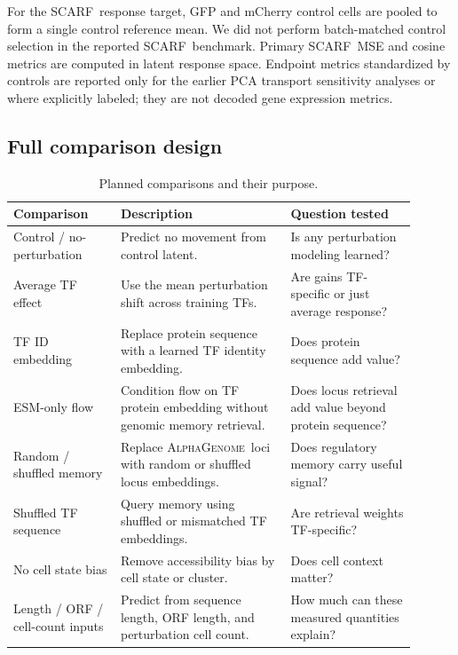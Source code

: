 \documentclass{article}
\newcommand{\ag}{\textsc{AlphaGenome}}
\newcommand{\scarf}{\textsc{SCARF}}
\begin{document}
For the \scarf\ response target, GFP and mCherry control cells are pooled to form a single control reference mean. We did not perform batch-matched control selection in the reported \scarf\ benchmark. Primary \scarf\ MSE and cosine metrics are computed in latent response space. Endpoint metrics standardized by controls are reported only for the earlier PCA transport sensitivity analyses or where explicitly labeled; they are not decoded gene expression metrics.

\subsection{Full comparison design}

\begin{table}[t]
\centering
\caption{Planned comparisons and their purpose.}
\label{tab:comparisons}
\begin{tabular}{p{0.24\linewidth}p{0.38\linewidth}p{0.28\linewidth}}
\toprule
\textbf{Comparison} & \textbf{Description} & \textbf{Question tested} \\
\midrule
Control / no-perturbation & Predict no movement from control latent. & Is any perturbation modeling learned? \\
Average TF effect & Use the mean perturbation shift across training TFs. & Are gains TF-specific or just average response? \\
TF ID embedding & Replace protein sequence with a learned TF identity embedding. & Does protein sequence add value? \\
ESM-only flow & Condition flow on TF protein embedding without genomic memory retrieval. & Does locus retrieval add value beyond protein sequence? \\
Random / shuffled memory & Replace \ag\ loci with random or shuffled locus embeddings. & Does regulatory memory carry useful signal? \\
Shuffled TF sequence & Query memory using shuffled or mismatched TF embeddings. & Are retrieval weights TF-specific? \\
No cell state bias & Remove accessibility bias by cell state or cluster. & Does cell context matter? \\
Length / ORF / cell-count inputs & Predict from sequence length, ORF length, and perturbation cell count. & How much can these measured quantities explain? \\
\bottomrule
\end{tabular}
\end{table}
\end{document}

